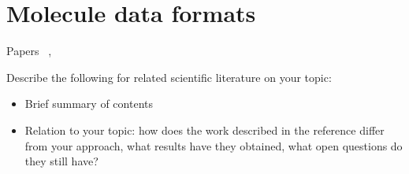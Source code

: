 \section{Molecule data formats}

Papers ~\cite{daylight1992daylight}, ~\cite{heller2013inchi}





Describe the following for related scientific literature on your topic:
\begin{itemize}
\item Brief summary of contents
\item Relation to your topic: how does the work described in the reference differ from your approach, what results have they obtained, what open questions do they still have?
\end{itemize}
